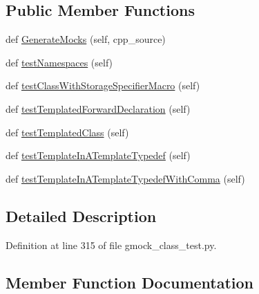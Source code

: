 \subsection*{Public Member Functions}
\begin{DoxyCompactItemize}
\item 
def \hyperlink{classcpp_1_1gmock__class__test_1_1GenerateMocksTest_afdce6749dca14c1aa90762d389d92c87}{Generate\+Mocks} (self, cpp\+\_\+source)
\item 
def \hyperlink{classcpp_1_1gmock__class__test_1_1GenerateMocksTest_a706812da9e8f79a689c707b4032db2d2}{test\+Namespaces} (self)
\item 
def \hyperlink{classcpp_1_1gmock__class__test_1_1GenerateMocksTest_aba1ab8ae8a897ea9c22a47bcd1524254}{test\+Class\+With\+Storage\+Specifier\+Macro} (self)
\item 
def \hyperlink{classcpp_1_1gmock__class__test_1_1GenerateMocksTest_a18cb0f03ecd4e54d0f787694c1513731}{test\+Templated\+Forward\+Declaration} (self)
\item 
def \hyperlink{classcpp_1_1gmock__class__test_1_1GenerateMocksTest_a4098c99b66f0cbea7be9e66352a20f4d}{test\+Templated\+Class} (self)
\item 
def \hyperlink{classcpp_1_1gmock__class__test_1_1GenerateMocksTest_a32a2840352d970c631d7be1b6d1970e6}{test\+Template\+In\+A\+Template\+Typedef} (self)
\item 
def \hyperlink{classcpp_1_1gmock__class__test_1_1GenerateMocksTest_a67d1336b8782257fcfcdbda8c8d4f794}{test\+Template\+In\+A\+Template\+Typedef\+With\+Comma} (self)
\end{DoxyCompactItemize}


\subsection{Detailed Description}


Definition at line 315 of file gmock\+\_\+class\+\_\+test.\+py.



\subsection{Member Function Documentation}
\mbox{\label{classcpp_1_1gmock__class__test_1_1GenerateMocksTest_afdce6749dca14c1aa90762d389d92c87}} 
